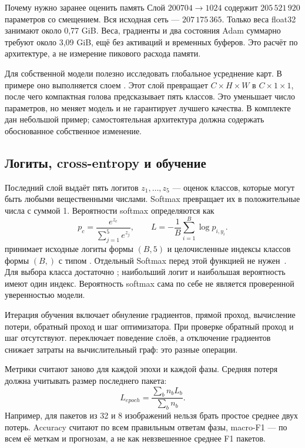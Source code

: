 \begin{keybox}{Почему нужно заранее оценить память}
Слой \(200704\to1024\) содержит \(205\,521\,920\) параметров со смещением. Вся исходная сеть --- \(207\,175\,365\). Только веса float32 занимают около 0,77 GiB. Веса, градиенты и два состояния Adam суммарно требуют около 3,09 GiB, ещё без активаций и временных буферов. Это расчёт по архитектуре, а не измерение пикового расхода памяти.
\end{keybox}

Для собственной модели полезно исследовать глобальное усреднение карт. В примере оно выполняется слоем . Этот слой превращает \(C\times H\times W\) в \(C\times1\times1\), после чего компактная голова предсказывает пять классов. Это уменьшает число параметров, но меняет модель и не гарантирует лучшего качества. В комплекте дан небольшой пример; самостоятельная архитектура должна содержать обоснованное собственное изменение.

\subsection{Логиты, cross-entropy и обучение}
Последний слой выдаёт пять логитов \(z_1,\ldots,z_5\) --- оценок классов, которые могут быть любыми вещественными числами. Softmax превращает их в положительные числа с суммой 1. Вероятности softmax определяются как
\begin{equation}
p_c=\frac{e^{z_c}}{\sum_{j=1}^{5}e^{z_j}},\qquad
L=-\frac1B\sum_{i=1}^{B}\log p_{i,y_i}.
\end{equation}
 принимает исходные логиты формы \((B,5)\) и целочисленные индексы классов формы \((B,)\) с типом . Отдельный Softmax перед этой функцией не нужен~\cite{crossentropy}. Для выбора класса достаточно ; наибольший логит и наибольшая вероятность имеют один индекс. Вероятность softmax сама по себе не является проверенной уверенностью модели.

Итерация обучения включает обнуление градиентов, прямой проход, вычисление потери, обратный проход и шаг оптимизатора. При проверке обратный проход и шаг отсутствуют.  переключает поведение слоёв, а отключение градиентов снижает затраты на вычислительный граф: это разные операции.

Метрики считают заново для каждой эпохи и каждой фазы. Средняя потеря должна учитывать размер последнего пакета:
\begin{equation}
L_{epoch}=\frac{\sum_b n_b L_b}{\sum_b n_b}.
\end{equation}
Например, для пакетов из 32 и 8 изображений нельзя брать простое среднее двух потерь. Accuracy считают по всем правильным ответам фазы, macro-F1 --- по всем её меткам и прогнозам, а не как невзвешенное среднее F1 пакетов.

